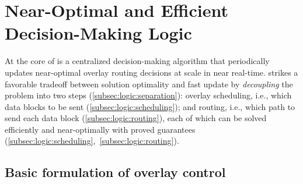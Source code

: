 \section{Near-Optimal and Efficient Decision-Making Logic}
\label{sec:logic}

At the core of \name is a centralized decision-making
algorithm that periodically updates near-optimal overlay
routing decisions at scale  in near real-time.
\name strikes a favorable tradeoff between solution optimality
and fast update by
{\em decoupling} the problem into two steps (\Section\ref{subsec:logic:separation}):
overlay scheduling, i.e., which data blocks to be sent
(\Section\ref{subsec:logic:scheduling});
and routing, i.e., which path to send each data block
(\Section\ref{subsec:logic:routing}), each of which
can be solved efficiently and near-optimally with proved guarantees
(\Section\ref{subsec:logic:scheduling},~\ref{subsec:logic:routing}).



\subsection{Basic formulation of overlay control}
\label{subsec:logic:formulation}

